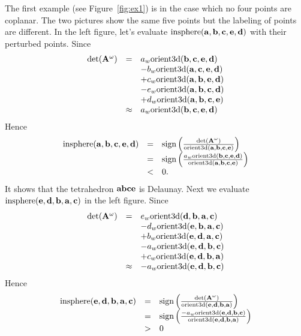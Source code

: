 The first example (see Figure~\ref{fig:ex1}) is in the case which no four points are coplanar. The two pictures show the same five points but the labeling of points are different.  In the left figure, let's evaluate $\textrm{insphere}({\bf a}, {\bf b}, {\bf c}, {\bf e}, {\bf d})$ with their perturbed points. Since
\[
\begin{array}{rcl}
\textrm{det}({\bf A}^{\omega}) &=& 
a_w\textrm{orient3d}({\bf b}, {\bf c}, {\bf e}, {\bf d})\\
& & -b_w\textrm{orient3d}({\bf a}, {\bf c}, {\bf e}, {\bf d})\\
& & +c_w\textrm{orient3d}({\bf a}, {\bf b}, {\bf e}, {\bf d})\\
& & -e_w\textrm{orient3d}({\bf a}, {\bf b}, {\bf c}, {\bf d})\\
& & +d_w\textrm{orient3d}({\bf a}, {\bf b}, {\bf c}, {\bf e})\\
&\approx& a_w\textrm{orient3d}({\bf b}, {\bf c}, {\bf e}, {\bf d})
\end{array}
\]
Hence
\[
\begin{array}{rcl}
\textrm{insphere}({\bf a}, {\bf b}, {\bf c}, {\bf e}, {\bf d}) &=&
\textrm{sign}\left(\frac{\textrm{det}({\bf A}^{\omega})}{\textrm{orient3d}({\bf a}, {\bf b}, {\bf c}, {\bf e})}\right)\\
&=& \textrm{sign}\left(\frac{a_w\textrm{orient3d}({\bf b}, {\bf c}, {\bf e}, {\bf d})}{\textrm{orient3d}({\bf a}, {\bf b}, {\bf c}, {\bf e})}\right)\\
&<& 0.
\end{array}
\]
It shows that the tetrahedron ${\bf abce}$ is Delaunay. Next we evaluate $\textrm{insphere}({\bf e}, {\bf d}, {\bf b}, {\bf a}, {\bf c})$ in the left figure. Since
\[
\begin{array}{rcl}
\textrm{det}({\bf A}^{\omega}) &=& 
e_w\textrm{orient3d}({\bf d}, {\bf b}, {\bf a}, {\bf c})\\
& & -d_w\textrm{orient3d}({\bf e}, {\bf b}, {\bf a}, {\bf c})\\
& & +b_w\textrm{orient3d}({\bf e}, {\bf d}, {\bf a}, {\bf c})\\
& & -a_w\textrm{orient3d}({\bf e}, {\bf d}, {\bf b}, {\bf c})\\
& & +c_w\textrm{orient3d}({\bf e}, {\bf d}, {\bf b}, {\bf a})\\
&\approx& -a_w\textrm{orient3d}({\bf e}, {\bf d}, {\bf b}, {\bf c})
\end{array}
\]
Hence
\[
\begin{array}{rcl}
\textrm{insphere}({\bf e}, {\bf d}, {\bf b}, {\bf a}, {\bf c}) &=&
\textrm{sign}\left(\frac{\textrm{det}({\bf A}^{\omega})}{\textrm{orient3d}({\bf e}, {\bf d}, {\bf b}, {\bf a})}\right)\\
&=& \textrm{sign}\left(\frac{-a_w\textrm{orient3d}({\bf e}, {\bf d}, {\bf b}, {\bf c})}{\textrm{orient3d}({\bf e}, {\bf d}, {\bf b}, {\bf a})}\right)\\
&>& 0
\end{array}
\]
